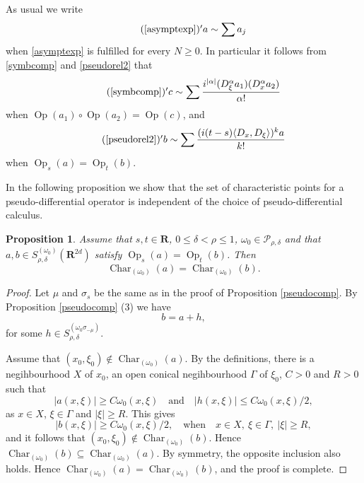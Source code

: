 \documentclass[12pt,a4paper,reqno]{amsart}
\numberwithin{equation}{section}
\numberwithin{thm}{section}
\newtheorem{prop}[thm]{Proposition}
\theoremstyle{definition}
\theoremstyle{remark}
\begin{document}
\par

As usual we write
\begin{equation}\tag*{(\ref{asymptexp})$'$}
a\sim \sum a_j
\end{equation}
when \eqref{asymptexp} is fulfilled for every $N\ge 0$. In particular
it follows from \eqref{symbcomp} and \eqref{pseudorel2} that
\begin{equation}\tag*{(\ref{symbcomp})$'$}
c\sim \sum \frac {i^{|\alpha |}(D^{\alpha}_\xi
a_1)(D^{\alpha}_x a_2)}{\alpha !}
\end{equation}
when ${\operatorname{Op}} (a_1)\circ {\operatorname{Op}} (a_2)={\operatorname{Op}} (c)$, and
\begin{equation}\tag*{(\ref{pseudorel2})$'$}
b\sim \sum \frac {(i(t-s){\langle {D_x},{D_\xi}\rangle})^{k}a}{k !}
\end{equation}
when ${\operatorname{Op}} _s(a)={\operatorname{Op}} _t(b)$.

\par

In the following proposition we show that the set of characteristic
points for a pseudo-differential operator is independent of the choice
of pseudo-differential calculus.

\par

\begin{prop}\label{anvandningkar}
Assume that $s,t\in \mathbf R$, $0\leq \delta < \rho\leq 1$,
$\omega_0\in\mathscr{P}_{\rho,\delta}$ and that $a,b\in
S^{(\omega_0)}_{\rho,\delta}({\mathbf R^{{2d}}})$ satisfy ${\operatorname{Op}}_s(a)={\operatorname{Op}}_t(b)$. Then
\begin{equation}\label{char}
{\operatorname{Char}}_{(\omega_0)}(a)={\operatorname{Char}}_{(\omega_0)}(b).
\end{equation}
\end{prop}

\par

\begin{proof}
Let $\mu$ and $\sigma _s$ be the same as in the proof of Proposition
\ref{pseudocomp}. By Proposition \ref{pseudocomp} (3) we have
$$
b=a+h,
$$
for some $h\in S^{(\omega_0\sigma_{-\mu})}_{\rho,\delta}$.

\par

Assume that $(x_0,\xi_0)\notin {\operatorname{Char}}_{(\omega_0)}(a)$. By the
definitions, there is a negihbourhood $X$ of $x_0$, an open conical
negihbourhood $\Gamma$ of $\xi_0$, $C>0$ and $R >0$ such that
$$
|a(x,\xi )| \ge C\omega _0(x,\xi )\quad \text{and}\quad |h(x,\xi )|\le
C\omega _0(x,\xi )/2,
$$
as $x\in X$, $\xi \in \Gamma$ and $|\xi |\ge R$. This gives
$$
|b(x,\xi )| \ge C\omega _0(x,\xi )/2,\quad \text{when}\quad x\in X,\
\xi \in \Gamma ,\ |\xi |\ge R,
$$
and it follows that $(x_0,\xi_0)\notin {\operatorname{Char}}_{(\omega_0)}(b)$. Hence
${\operatorname{Char}}_{(\omega_0)}(b)\subseteq {\operatorname{Char}}_{(\omega_0)}(a)$. By symmetry, 
the opposite inclusion also holds. Hence
${\operatorname{Char}}_{(\omega_0)}(a) = {\operatorname{Char}}_{(\omega_0)}(b)$, and the proof is
complete.
\end{proof}
\end{document}
